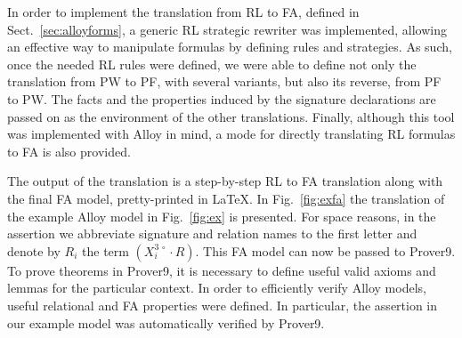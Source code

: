 \documentclass{llncs}
\begin{document}
In order to implement the translation from RL to FA, defined in
Sect.~\ref{sec:alloyforms}, a generic RL strategic rewriter was
implemented, allowing an effective way to manipulate formulas by
defining rules and strategies. As such, once the needed RL rules were
defined, we were able to define not only the translation from PW to
PF, with several variants, but also its reverse, from PF to PW. The
facts and the properties induced by the signature declarations are
passed on as the environment of the other translations. Finally,
although this tool was implemented with Alloy in mind, a mode for
directly translating RL formulas to FA is also provided.

The output of the translation is a step-by-step RL to FA translation
along with the final FA model, pretty-printed in \LaTeX. In
Fig.~\ref{fig:exfa} the translation of the example Alloy model in
Fig.~\ref{fig:ex} is presented. For space reasons, in the assertion we
abbreviate signature and relation names to the first letter and denote
by $R_i$ the term $(X_i^{3 \, \circ} \cdot R)$. This FA model can now
be passed to Prover9. To prove theorems in Prover9, it is necessary to
define useful valid axioms and lemmas for the particular
context. In order to efficiently verify Alloy models, useful
relational and FA properties were defined. In particular, the
assertion in our example model was automatically verified by Prover9.
\end{document}
